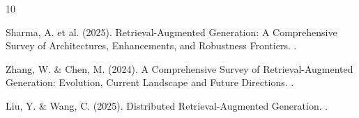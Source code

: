 \documentclass[12pt,a4paper]{article}
\begin{document}

\begin{thebibliography}{10}

Sharma, A. et al. (2025).
\newblock Retrieval-Augmented Generation: A Comprehensive Survey of Architectures, Enhancements, and Robustness Frontiers.
.

Zhang, W. \& Chen, M. (2024).
\newblock A Comprehensive Survey of Retrieval-Augmented Generation: Evolution, Current Landscape and Future Directions.
.

Liu, Y. \& Wang, C. (2025).
\newblock Distributed Retrieval-Augmented Generation.
.

\end{thebibliography}
\end{document}
